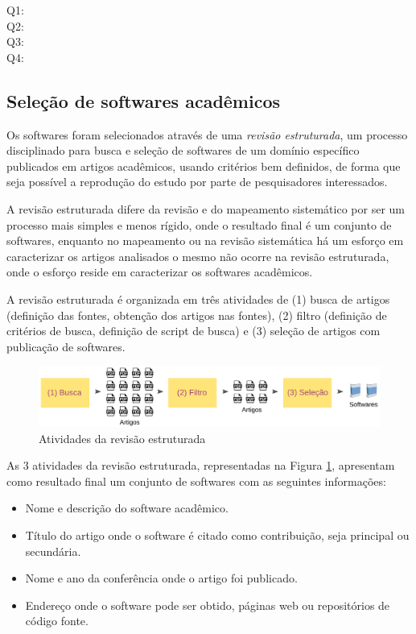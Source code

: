 \begin{description}
  \item [Q1:] \QuestaoUm
  \item [Q2:] \QuestaoDois
  \item [Q3:] \QuestaoTres
  \item [Q4:] \QuestaoQuatro
\end{description}

\subsection{Seleção de softwares acadêmicos}

Os softwares foram selecionados através de uma {\it revisão estruturada}, um processo disciplinado
para busca e seleção de softwares de um domínio específico publicados em
artigos acadêmicos, usando critérios bem definidos, de forma que seja
possível a reprodução do estudo por parte de pesquisadores interessados.

A revisão estruturada difere da revisão e do mapeamento sistemático
\cite{Kitchenham2007} por ser um processo mais simples e menos rígido, onde o
resultado final é um conjunto de softwares, enquanto no mapeamento ou na
revisão sistemática há um esforço em caracterizar os artigos analisados o mesmo
não ocorre na revisão estruturada, onde o esforço reside em caracterizar os
softwares acadêmicos.

A revisão estruturada é organizada em três atividades de (1) busca de artigos
(definição das fontes, obtenção dos artigos nas fontes), (2) filtro (definição
de critérios de busca, definição de script de busca) e (3) seleção de artigos
com publicação de softwares.

\begin{figure}[h]
  \center
  \includegraphics[scale=0.21]{imagens/revisao-estruturada.png}
  \caption{Atividades da revisão estruturada}
  \label{figura-revisao-estruturada}
\end{figure}

As 3 atividades da revisão estruturada, representadas na Figura
\ref{figura-revisao-estruturada}, apresentam como resultado final um conjunto
de softwares com as seguintes informações:

\begin{itemize}
  \item Nome e descrição do software acadêmico.
  \item Título do artigo onde o software é citado como contribuição, seja principal ou secundária.
  \item Nome e ano da conferência onde o artigo foi publicado.
  \item Endereço onde o software pode ser obtido, páginas web ou repositórios de código fonte.
\end{itemize}

